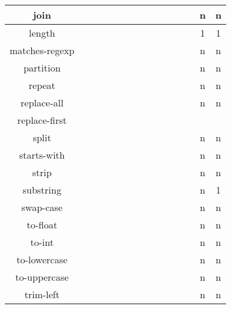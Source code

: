 \documentclass[anonymous,sigplan,review,11pt,nonacm,natbib=false]{acmart}
\begin{document}
\begin{table*}[]
\begin{tabular}{|c||c|c|c|c|c|c|c|c|c|c|c|c|c|c|}
            join &  &  &  &  &  &  &  &  &  &  &  &  & n & n \\ \hline

            length &  &  &  &  &  &  &  &  &  &  &  &  & 1 & 1 \\ \hline

            matches-regexp &  &  &  &  &  &  &  &  &  &  &  &  & n & n \\ \hline

            partition &  &  &  &  &  &  &  &  &  &  &  &  & n & n \\ \hline

            repeat &  &  &  &  &  &  &  &  &  &  &  &  & n & n \\ \hline

            replace-all &  &  &  &  &  &  &  &  &  &  &  &  & n & n \\ \hline

            replace-first &  &  &  &  &  &  &  &  &  &   &  &  &  & \\ \hline

            split &  &  &  &  &  &  &  &  &  &  &  &  & n & n \\ \hline

            starts-with &  &  &  &  &  &  &  &  &  &  &  &  & n & n \\ \hline

            strip &  &  &  &  &  &  &  &  &  &  &  &  & n & n \\ \hline

            substring &  &  &  &  &  &  &  &  &  &  &  &  & n & 1 \\ \hline

            swap-case &  &  &  &  &  &  &  &  &  &  &  &  & n & n \\ \hline

            to-float &  &  &  &  &  &  &  &  &  &  &  &  & n & n \\ \hline

            to-int &  &  &  &  &  &  &  &  &  &  &  &  & n & n \\ \hline

            to-lowercase &  &  &  &  &  &  &  &  &  &  &  &  & n & n \\ \hline

            to-uppercase &  &  &  &  &  &  &  &  &  &  &  &  & n & n \\ \hline

            trim-left &  &  &  &  &  &  &  &  &  &  &  &  & n & n \\ \hline


\end{tabular}
\end{table*}
\end{document}
